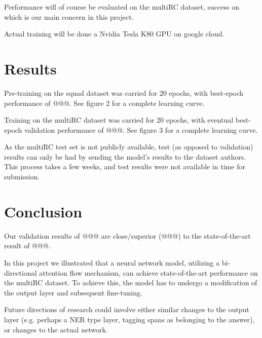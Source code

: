 \documentclass[12pt, a4paper]{article}
\begin{document}
\begin{multicols}{2}
			Performance will of course be evaluated on the multiRC dataset, success on which is our main concern in this project.
			
			Actual training will be done a Nvidia Tesla K80 GPU on google cloud.
			
		\section{Results}
		
			Pre-training on the squad dataset was carried for 20 epochs, with best-epoch performance of @@@. See figure 2 for a complete learning curve.
			
			Training on the multiRC dataset was carried for 20 epochs, with eventual best-epoch validation performance of @@@. See figure 3 for a complete learning curve.
			
			As the multiRC test set is not publicly available, test (as opposed to validation) results can only be had by sending the model's results to the dataset authors. This process takes a few weeks, and test results were not available in time for submission.
			
		\section{Conclusion}
		
			Our validation results of @@@ are close/superior (@@@) to the state-of-the-art result of @@@.
		
			In this project we illustrated that a neural network model, utilizing a bi-directional attention flow mechanism, can achieve state-of-the-art performance on the multiRC dataset. To achieve this, the model has to undergo a modification of the output layer and subsequent fine-tuning.
			
			Future directions of research could involve either similar changes to the output layer (e.g. perhaps a NER type layer, tagging spans as belonging to the answer), or changes to the actual network.
		
	\end{multicols}
\end{document}

